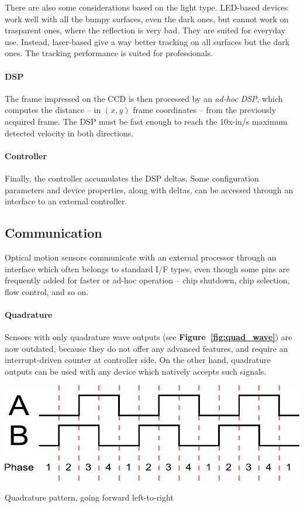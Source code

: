\documentclass[a4paper,10pt]{article}
\makeatletter
\newenvironment{figurehere}{\def\@captype{figure}\vspace{2ex}}{\vspace{2ex}}
\makeatother
\begin{document}
\begin{multicols}{2}
There are also some considerations based on the light type. LED-based devices
work well with all the bumpy surfaces, even the dark ones, but cannot work
on trasparent ones, where the reflection is very bad. They are suited for
everyday use.
Instead, laser-based give a way better tracking on all surfaces but the dark
ones. The tracking performance is suited for professionals.


\paragraph{DSP}
The frame impressed on the CCD is then processed by an \textit{ad-hoc}
\emph{DSP}, which computes the distance -- in $(x,y)$ frame coordinates --
from the previously acquired frame. The DSP must be fast enough to reach the
10x-in/s maximum detected velocity in both directions.


\paragraph{Controller}
Finally, the controller accumulates the DSP deltas. Some configuration
parameters and device properties, along with deltas, can be accessed through
an interface to an external controller.


\subsection{Communication}

Optical motion sensors communicate with an external processor through an
interface which often belongs to standard I/F types, even though some pins
are frequently added for faster or ad-hoc operation -- chip shutdown, chip
selection, flow control, and so on.


\paragraph{Quadrature}
Sensors with only quadrature wave outputs (see \textbf{Figure~\ref{fig:quad_wave}})
are now outdated, because they do not offer any advanced features, and require
an interrupt-driven counter at controller side. On the other hand, quadrature
outputs can be used with any device which natively accepts such signals.

\begin{figurehere}
	\label{fig:quad_wave}
	\centering
	\includegraphics[keepaspectratio=true,width=0.8\columnwidth]{images/quad_wave.pdf}
	\caption{Quadrature pattern, going forward left-to-right}
\end{figurehere}



\end{multicols}
\end{document}
